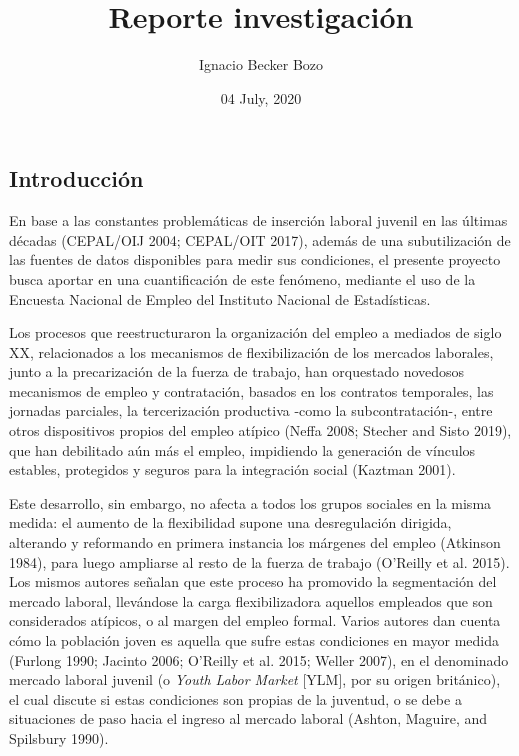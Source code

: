 \documentclass[]{article}
\title{Reporte investigación}
\author{Ignacio Becker Bozo}
\date{04 July, 2020}
\begin{document}
\maketitle

\hypertarget{introducciuxf3n}{%
\subsection{Introducción}\label{introducciuxf3n}}

En base a las constantes problemáticas de inserción laboral juvenil en
las últimas décadas (CEPAL/OIJ 2004; CEPAL/OIT 2017), además de una
subutilización de las fuentes de datos disponibles para medir sus
condiciones, el presente proyecto busca aportar en una cuantificación de
este fenómeno, mediante el uso de la Encuesta Nacional de Empleo del
Instituto Nacional de Estadísticas.

Los procesos que reestructuraron la organización del empleo a mediados
de siglo XX, relacionados a los mecanismos de flexibilización de los
mercados laborales, junto a la precarización de la fuerza de trabajo,
han orquestado novedosos mecanismos de empleo y contratación, basados en
los contratos temporales, las jornadas parciales, la tercerización
productiva -como la subcontratación-, entre otros dispositivos propios
del empleo atípico (Neffa 2008; Stecher and Sisto 2019), que han
debilitado aún más el empleo, impidiendo la generación de vínculos
estables, protegidos y seguros para la integración social (Kaztman
2001).

Este desarrollo, sin embargo, no afecta a todos los grupos sociales en
la misma medida: el aumento de la flexibilidad supone una desregulación
dirigida, alterando y reformando en primera instancia los márgenes del
empleo (Atkinson 1984), para luego ampliarse al resto de la fuerza de
trabajo (O'Reilly et al. 2015). Los mismos autores señalan que este
proceso ha promovido la segmentación del mercado laboral, llevándose la
carga flexibilizadora aquellos empleados que son considerados atípicos,
o al margen del empleo formal. Varios autores dan cuenta cómo la
población joven es aquella que sufre estas condiciones en mayor medida
(Furlong 1990; Jacinto 2006; O'Reilly et al. 2015; Weller 2007), en el
denominado mercado laboral juvenil (o \emph{Youth Labor Market}
{[}YLM{]}, por su origen británico), el cual discute si estas
condiciones son propias de la juventud, o se debe a situaciones de paso
hacia el ingreso al mercado laboral (Ashton, Maguire, and Spilsbury
1990).
\end{document}
